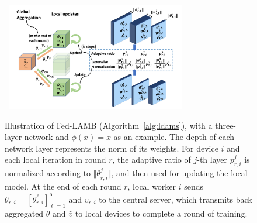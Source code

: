 \documentclass[11pt]{article}
\def\tot{\mathsf{h}}
\begin{document}
\begin{figure}[H]
\centering
\mbox{\hspace{-0.15in}
        \includegraphics[width=0.7\textwidth]{plot/plot1.pdf}
}
	\caption{Illustration of Fed-LAMB (Algorithm~\ref{alg:ldams}), with a three-layer network and $\phi(x)=x$ as an example. The depth of each network layer represents the norm of its weights. For device $i$ and each local iteration in round $r$, the adaptive ratio of $j$-th layer $p_{r,i}^j$ is normalized according to $\Vert \theta_{r,i}^j\Vert$, and then used for updating the local model. At the end of each round $r$, local worker $i$ sends $\theta_{r,i} =  [\theta_{r,i}^{\ell}]_{\ell =1}^{\tot}$ and $v_{r,i}$ to the central server, which transmits back aggregated $\theta$ and $\hat v$ to local devices to complete a round of training.}
	\label{fig:illustrate}\vspace{-0.1in}
\end{figure}
\end{document}
